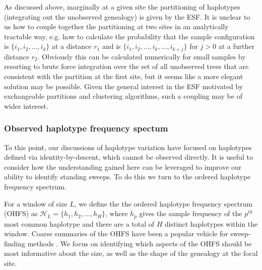 \documentclass[a4paper,10pt]{article}
\begin{document}
As discussed above, marginally at a given site the partitioning of haplotypes (integrating out the unobserved genealogy) is given by the ESF. It is unclear to us how to couple together the partitioning at two sites in an analytically tractable way, e.g. how to calculate the probability that the sample configuration is $\{i_1,i_2,\dots,i_k\}$ at a distance $r_1$ and is $\{i_1,i_2,\dots,i_k,\dots,i_{k+j}\}$ for $j>0$ at a further distance $r_2$. Obviously this can be calculated numerically for small samples by resorting to brute force integration over the set of all unobserved trees that are consistent with the partition at the first site, but it seems like a more elegant solution may be possible. Given the general interest in the ESF motivated by exchangeable partitions and clustering algorithms, such a coupling may be of wider interest.
 
\subsubsection*{Observed haplotype frequency spectum}
To this point, our discussions of haplotype variation have focused on haplotypes defined via identity-by-descent, which cannot be observed directly. It is useful to consider how the understanding gained here can be leveraged to improve our ability to identify standing sweeps. To do this we turn to the ordered haplotype frequency spectrum.




For a window of size $L$, we define the the ordered haplotype frequency spectrum (OHFS) as $\mathcal{H}_L = \{h_1,h_2,\dots,h_{H}\}$, where $h_p$ gives the sample frequency of the $p^{th}$ most common haplotype and there are a total of $H$ distinct haplotypes within the window. Coarse summaries of the OHFS have been a popular vehicle for sweep-finding methods \cite[e.g. EHH, iHS and H12:][]{Sabeti:2002ge,Voight:2006go,Garud:2015jy}. We focus on identifying which aspects of the OHFS should be most informative about the size, as well as the shape of the genealogy at the focal site.
\end{document}
